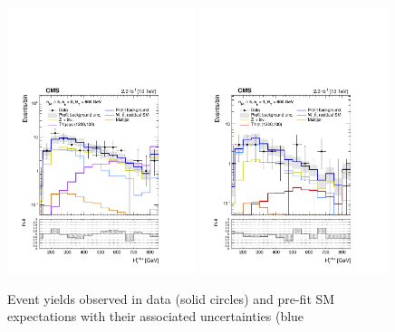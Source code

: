 \begin{figure}[!t]
  \begin{center}
    \includegraphics[width=0.49\textwidth]{figures/mht_shapes/v3/postFitShape_eq0b_ge5j_800_Inf_prefit} 
    \includegraphics[width=0.49\textwidth]{figures/mht_shapes/v3/postFitShape_eq1b_ge5j_800_Inf_prefit} \\
  \end{center}
  \caption{Event yields observed in data (solid circles) and pre-fit
    SM expectations with their associated uncertainties (blue
}
\end{figure}
